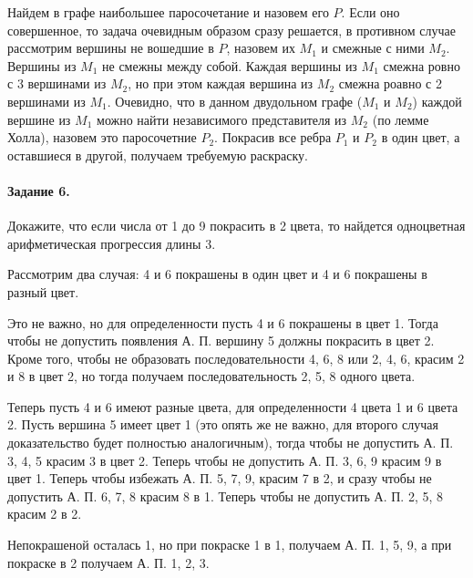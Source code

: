 \documentclass[a4paper,12pt]{article}
\begin{document}
\begin{Solution}
Найдем в графе наибольшее паросочетание и назовем его $P$. Если оно совершенное, то задача очевидным образом сразу решается, в противном случае рассмотрим вершины не вошедшие в $P$, назовем их $M_1$ и смежные с ними $M_2$. Вершины из $M_1$ не смежны между собой. Каждая вершины из $M_1$ смежна ровно с 3 вершинами из $M_2$, но при этом каждая вершина из $M_2$ смежна роавно с 2 вершинами из $M_1$. Очевидно, что в данном двудольном графе ($M_1$ и $M_2$) каждой вершине из $M_1$ можно найти независимого представителя из $M_2$ (по лемме Холла), назовем это паросочетние $P_2$. Покрасив все ребра $P_1$ и $P_2$ в один цвет, а оставшиеся в другой, получаем требуемую раскраску.
\end{Solution}

\paragraph{Задание 6.} Докажите, что если числа от 1 до 9 покрасить в 2 цвета, то найдется одноцветная арифметическая прогрессия длины 3.

\begin{Solution}
Рассмотрим два случая: 4 и 6 покрашены в один цвет и 4 и 6 покрашены в разный цвет.

Это не важно, но для определенности пусть 4 и 6 покрашены в цвет 1. Тогда чтобы не допустить появления А. П. вершину 5 должны покрасить в цвет 2. Кроме того, чтобы не образовать последовательности 4, 6, 8 или 2, 4, 6, красим 2 и 8 в цвет 2, но тогда получаем последовательность 2, 5, 8 одного цвета.

Теперь пусть 4 и 6 имеют разные цвета, для определенности 4 цвета 1 и 6 цвета 2. Пусть вершина 5 имеет цвет 1 (это опять же не важно, для второго случая доказательство будет полностью аналогичным), тогда чтобы не допустить А. П. 3, 4, 5 красим 3 в цвет 2. Теперь чтобы не допустить А. П. 3, 6, 9 красим 9 в цвет 1. Теперь чтобы избежать А. П. 5, 7, 9, красим 7 в 2, и сразу чтобы не допустить А. П. 6, 7, 8 красим 8 в 1. Теперь чтобы не допустить А. П. 2, 5, 8 красим 2 в 2.

Непокрашеной осталась 1, но при покраске 1 в 1, получаем А. П. 1, 5, 9, а при покраске в 2 получаем А. П. 1, 2, 3.
\end{Solution}
\end{document}

